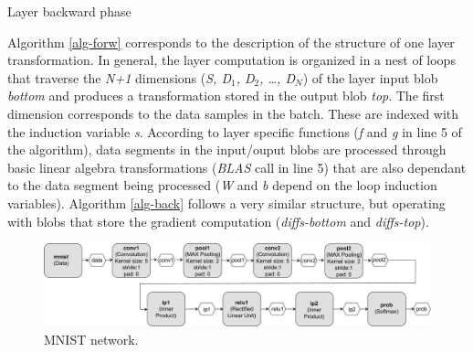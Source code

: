 \begin{algorithm}
\caption{Layer backward phase}
\label{alg-back}
\BlankLine
{}
\end{algorithm}

Algorithm \ref{alg-forw} corresponds to the description of the structure 
of one layer transformation. In general, the layer computation is organized 
in a nest of loops that traverse the \emph{N+1} dimensions (\emph{S, D$_1$, 
D$_2$, \dots, D$_N$}) of the layer input blob \emph{bottom} and produces 
a transformation stored in the output blob \emph{top}. The first dimension 
corresponds to the data samples in the batch. These are indexed with the 
induction variable \emph{s}.  According to layer specific functions 
(\emph{f} and \emph{g} in line 5 of the algorithm), 
data segments in the input/ouput blobs are processed through basic linear 
algebra transformations (\emph{BLAS} call in line 5) that are also 
dependant to the data segment being processed (\emph{W} and \emph{b} 
depend on the loop induction variables). Algorithm 
\ref{alg-back} follows a very similar structure, but operating with 
blobs that store the gradient computation (\emph{diffs-bottom} and 
\emph{diffs-top}).


\begin{figure}[]
\centering
\includegraphics[width=13.5cm]{figures/mnist.pdf}
\caption{MNIST network.}
\label{fig-mnist}
\end{figure}

